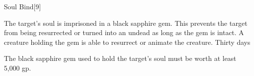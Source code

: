 \begin{spellsection}{Soul Bind}[9]
    \begin{spellheader}
    \end{spellheader}
    \begin{spellcontent}
        \begin{spelltargetinginfo}
        \end{spelltargetinginfo}
        \begin{spelleffects}
            \spelleffect The target's soul is imprisoned in a black sapphire gem. This prevents the target from being resurrected or turned into an undead as long as the gem is intact. A creature holding the gem is able to resurrect or animate the creature.
            \spelldur Thirty days
        \end{spelleffects}
    \end{spellcontent}
    \begin{spellfooter}
        \spellnotes The black sapphire gem used to hold the target's soul must be worth at least 5,000 gp.
    \end{spellfooter}
    \begin{spellaugments}
    \end{spellaugments}
\end{spellsection}


